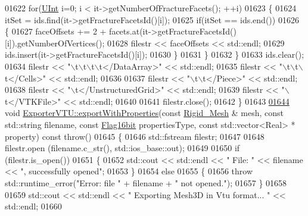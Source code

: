 \begin{DoxyCode}
01622         \textcolor{keywordflow}{for}(\hyperlink{namespaceFVCode3D_a4bf7e328c75d0fd504050d040ebe9eda}{UInt} i=0; i < it->getNumberOfFractureFacets(); ++i)
01623         \{
01624             itSet = ids.find(it->getFractureFacetsId()[i]);
01625             \textcolor{keywordflow}{if}(itSet == ids.end())
01626             \{
01627                 faceOffsets += 2 + facets.at(it->getFractureFacetsId()[i]).getNumberOfVertices();
01628                 filestr << faceOffsets << std::endl;
01629                 ids.insert(it->getFractureFacetsId()[i]);
01630             \}
01631         \}
01632     \}
01633     ids.clear();
01634     filestr << \textcolor{stringliteral}{"\(\backslash\)t\(\backslash\)t\(\backslash\)t\(\backslash\)t</DataArray>"} << std::endl;
01635     filestr << \textcolor{stringliteral}{"\(\backslash\)t\(\backslash\)t\(\backslash\)t</Cells>"} << std::endl;
01636 
01637     filestr << \textcolor{stringliteral}{"\(\backslash\)t\(\backslash\)t</Piece>"} << std::endl;
01638     filestr << \textcolor{stringliteral}{"\(\backslash\)t</UnstructuredGrid>"} << std::endl;
01639     filestr << \textcolor{stringliteral}{"\(\backslash\)t</VTKFile>"} << std::endl;
01640 
01641     filestr.close();
01642 \}
01643 
\hypertarget{ExportVTU_8cpp_source.tex_l01644}{}\hyperlink{classFVCode3D_1_1ExporterVTU_a2500450bb97bf68e5a6a5f035b2b775d}{01644} \textcolor{keywordtype}{void} \hyperlink{classFVCode3D_1_1ExporterVTU_a12240c4de9e7b3a5bf8f513c873c4547}{ExporterVTU::exportWithProperties}(\textcolor{keyword}{const} 
      \hyperlink{classFVCode3D_1_1Rigid__Mesh}{Rigid\_Mesh} & mesh, \textcolor{keyword}{const} std::string filename, \textcolor{keyword}{const} \hyperlink{namespaceFVCode3D_a17a9cb86e2e25bbfbfcb645a2eec1d64}{Flag16bit} propertiesType, \textcolor{keyword}{const} 
      std::vector<Real> * property) \textcolor{keyword}{const} \textcolor{keywordflow}{throw}()
01645 \{
01646     std::fstream filestr;
01647 
01648     filestr.open (filename.c\_str(), std::ios\_base::out);
01649 
01650     \textcolor{keywordflow}{if} (filestr.is\_open())
01651     \{
01652         std::cout << std::endl << \textcolor{stringliteral}{" File: "} << filename << \textcolor{stringliteral}{", successfully opened"};
01653     \}
01654     \textcolor{keywordflow}{else}
01655     \{
01656         \textcolor{keywordflow}{throw} std::runtime\_error(\textcolor{stringliteral}{"Error: file "} + filename + \textcolor{stringliteral}{" not opened."});
01657     \}
01658 
01659     std::cout << std::endl << \textcolor{stringliteral}{" Exporting Mesh3D in Vtu format... "} << std::endl;
01660 

\end{DoxyCode}
